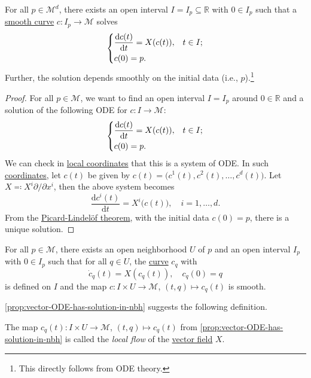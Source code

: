 \begin{proposition}\label{prop:vector-ODE-has-solution}
	For all \(p\in \mathcal{M} ^d\), there exists an open interval \(I = I_p \subseteq \mathbb{R} \) with \(0\in I_p\) such that a \hyperref[def:curve]{smooth curve} \(c\colon I_p \to \mathcal{M} \) solves
	\[
		\begin{dcases}
			\frac{\mathrm{d}c(t)}{\mathrm{d}t} = X(c(t)), & t\in I; \\
			c(0) = p.
		\end{dcases}
	\]
	Further, the solution depends smoothly on the initial data (i.e., \(p\)).\footnote{This directly follows from ODE theory.}
\end{proposition}
\begin{proof}
	For all \(p\in \mathcal{M} \), we want to find an open interval \(I = I_p\) around \(0\in \mathbb{R} \) and a solution of the following ODE for \(c\colon I \to \mathcal{M} \):
	\[
		\begin{dcases}
			\frac{\mathrm{d}c(t)}{\mathrm{d}t} = X(c(t)), & t\in I; \\
			c(0) = p.
		\end{dcases}
	\]
	We can check in \hyperref[def:coordinate-chart]{local coordinates} that this is a system of ODE. In such \hyperref[def:coordinate-chart]{coordinates}, let \(c(t)\) be given by \(c(t) = \big(c^1(t), c^2(t), \dots , c^d(t)\big)\). Let \(X \eqqcolon X^i \partial / \partial x^i\), then the above system becomes
	\[
		\frac{\mathrm{d}c^i(t)}{\mathrm{d}t} = X^i\big(c(t)\big) ,\quad i = 1, \dots , d.
	\]
	From the \href{https://en.wikipedia.org/wiki/Picard%E2%80%93Lindel%C3%B6f_theorem}{Picard-Lindelöf theorem}, with the initial data \(c(0)=p\), there is a unique solution.	
\end{proof}

\begin{proposition}\label{prop:vector-ODE-has-solution-in-nbh}
	For all \(p\in \mathcal{M} \), there exists an open neighborhood \(U\) of \(p\) and an open interval \(I_p\) with \(0\in I_p\) such that for all \(q\in U\), the \hyperref[def:curve]{curve} \(c_q\) with
	\[
		\dot{c}_q(t) = X(c_q(t)),\quad c_q(0) = q
	\]
	is defined on \(I\) and the map \(c\colon I \times U \to \mathcal{M} \), \((t, q) \mapsto c_q(t)\) is smooth.
\end{proposition}

\autoref{prop:vector-ODE-has-solution-in-nbh} suggests the following definition.

\begin{definition}\label{def:local-flow}
	The map \(c_q(t) \colon I\times U \to \mathcal{M} \), \((t, q)\mapsto c_q(t)\) from \autoref{prop:vector-ODE-has-solution-in-nbh} is called the \emph{local flow} of the \hyperref[def:vector-field]{vector field} \(X\).
\end{definition}

